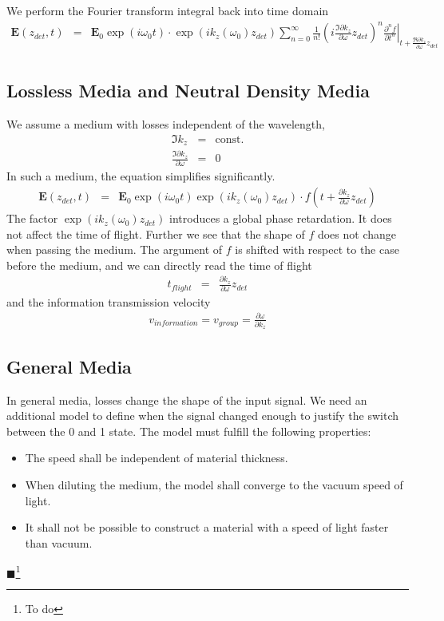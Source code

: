 \documentclass[12pt,a4paper,twoside,openright,BCOR10mm,headsepline,titlepage,abstracton,chapterprefix,final]{scrreprt}
\newcommand\Vector[1]{{\mathbf{#1}}}
\newcommand\wavenumber{k}
\newcommand\scalarEfield{E}
\newcommand\Efield{\Vector{\scalarEfield}}
\newcommand{\remark}[1]{{\color{red}$\blacksquare$}\footnote{{\color{red}#1}}}
\begin{document}
We perform the Fourier transform integral back into time domain
\begin{eqnarray}
\Efield(z_{det}, t) &=& 
  \Efield_0 \exp ( i \omega_0 t)
  \cdot
     \exp (i \wavenumber_z(\omega_0) z_{det})
     \sum_{n=0}^{\infty}
          \frac{1}{n!}
          \left(i \frac{\Im \partial \wavenumber_z}{\partial \omega} z_{det}\right)^n 
     \left. 
       \frac{\partial^n f}{\partial t^n}
     \right|_{t + \frac{\Re \partial \wavenumber_z}{\partial \omega} z_{det}}
  \nonumber\\
\end{eqnarray}


\subsection{Lossless Media and Neutral Density Media}
We assume a medium with losses independent of the wavelength, 
\begin{eqnarray}
 \Im \wavenumber_z &=& \textrm{const.} \\
 \frac{\Im \partial \wavenumber_z}{\partial \omega} &=& 0
\end{eqnarray}
In such a medium, the equation simplifies significantly.
\begin{eqnarray}
\Efield(z_{det}, t)
 &=&
 \Efield_0 \exp ( i \omega_0 t) \exp (i \wavenumber_z(\omega_0) z_{det}) 
 \cdot f\left(t + \frac{ \partial \wavenumber_z}{\partial \omega} z_{det}\right)
\end{eqnarray}
The factor $\exp (i \wavenumber_z(\omega_0) z_{det})$ introduces 
a global phase retardation. It does not affect the time of flight.
Further we see that the shape of $f$ does not change when passing the medium.
The argument of $f$ is shifted with respect to the case before the medium, and
we can directly read the time of flight
\begin{eqnarray}
 t_{flight} &=& \frac{ \partial \wavenumber_z}{\partial \omega} z_{det}
\end{eqnarray}
and the information transmission velocity
\begin{eqnarray}
 v_{information} = v_{group} = \frac{\partial \omega}{\partial \wavenumber_z}
\end{eqnarray}

\subsection{General Media}
In general media, losses change the shape of the input signal.
We need an additional model to define when the signal changed enough
to justify the switch between the 0 and 1 state.
The model must fulfill the following properties:
\begin{itemize}
 \item The speed shall be independent of material thickness.
 \item When diluting the medium,
       the model shall converge to the vacuum speed of light.
 \item It shall not be possible to construct a material
       with a speed of light faster than vacuum.
\end{itemize}
\remark{To do}
\end{document}
